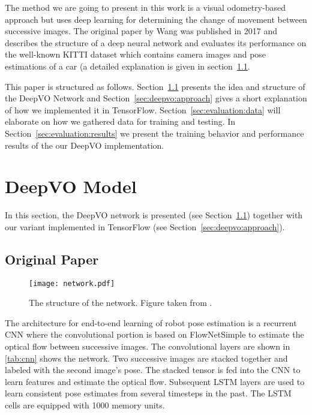 \documentclass[a4paper,11pt]{article}
\begin{document}
The method we are going to present in this work is a visual odometry-based
approach but uses deep learning for determining the change of movement between
successive images. The original paper by Wang \etal{} \cite{wang2017deepvo} was
published in 2017 and describes the structure of a deep neural network
and evaluates its performance on the well-known KITTI dataset
which contains camera images and pose estimations of a car (a detailed
explanation is given in section~\ref{sec:deepvo:original}.

This paper is structured as follows. Section~\ref{sec:deepvo:original} presents
the idea and structure of the DeepVO Network and
Section~\ref{sec:deepvo:approach} gives a short explanation of how we
implemented it in TensorFlow. Section~\ref{sec:evaluation:data} will elaborate
on how we gathered data for training and testing. In
Section~\ref{sec:evaluation:results} we present the training behavior and
performance results of the our DeepVO implementation.


\section{DeepVO Model}
\label{sec:deepvo}
In this section, the DeepVO network is presented (see Section~\ref{sec:deepvo:original}) together with our variant implemented in TensorFlow (see Section~\ref{sec:deepvo:approach}).


\subsection{Original Paper}
\label{sec:deepvo:original}

\begin{figure}[tbh]
    \centering
    \texttt{[image: network.pdf]}
    \caption{The structure of the network. Figure taken from \cite{wang2017deepvo}.}
    \label{fig:network}
\end{figure}


The architecture for end-to-end learning of robot pose estimation is a recurrent
CNN where the convolutional portion is based on FlowNetSimple \cite{flownet} to
estimate the optical flow between successive images. The convolutional layers
are shown in \autoref{tab:cnn}
shows the network. Two successive images are stacked together and labeled with
the second image's pose. The stacked tensor is fed into the CNN to learn
features and estimate the optical flow. Subsequent LSTM layers are used to learn
consistent pose estimates from several timesteps in the past. The LSTM cells are
equipped with 1000 memory units.
\end{document}
